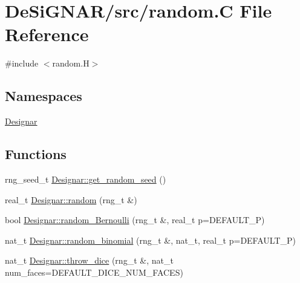 \hypertarget{random_8_c}{}\section{De\+Si\+G\+N\+A\+R/src/random.C File Reference}
\label{random_8_c}
{\ttfamily \#include $<$random.\+H$>$}\newline
\subsection*{Namespaces}
\begin{DoxyCompactItemize}
\item 
 \hyperlink{namespace_designar}{Designar}
\end{DoxyCompactItemize}
\subsection*{Functions}
\begin{DoxyCompactItemize}
\item 
rng\+\_\+seed\+\_\+t \hyperlink{namespace_designar_a39f540907bf568cf8e9983cffbc5246c}{Designar\+::get\+\_\+random\+\_\+seed} ()
\item 
real\+\_\+t \hyperlink{namespace_designar_ae380ee144e16364a26bec38110ac58cc}{Designar\+::random} (rng\+\_\+t \&)
\item 
bool \hyperlink{namespace_designar_adf6febbe5fa0abe44ea554203b767685}{Designar\+::random\+\_\+\+Bernoulli} (rng\+\_\+t \&, real\+\_\+t p=D\+E\+F\+A\+U\+L\+T\+\_\+P)
\item 
nat\+\_\+t \hyperlink{namespace_designar_a4f786bd2e0e15f81f468cf60b3a1d9fb}{Designar\+::random\+\_\+binomial} (rng\+\_\+t \&, nat\+\_\+t, real\+\_\+t p=D\+E\+F\+A\+U\+L\+T\+\_\+P)
\item 
nat\+\_\+t \hyperlink{namespace_designar_a29b53c8e7dfb33209e0a79ad167b6803}{Designar\+::throw\+\_\+dice} (rng\+\_\+t \&, nat\+\_\+t num\+\_\+faces=D\+E\+F\+A\+U\+L\+T\+\_\+\+D\+I\+C\+E\+\_\+\+N\+U\+M\+\_\+\+F\+A\+C\+ES)
\end{DoxyCompactItemize}
